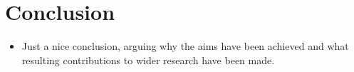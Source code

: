 \chapter{Conclusion}
\begin{itemize}
    \item Just a nice conclusion, arguing why the aims have been achieved and what resulting contributions to wider research have been made.
\end{itemize}